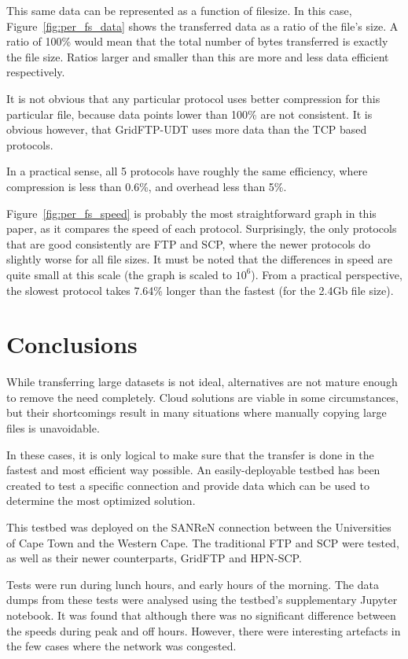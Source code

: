 \documentclass{sig-alternate-05-2015}
\begin{document}
This same data can be represented as a function of filesize. In this case, Figure~\ref{fig:per_fs_data} shows the transferred data as a ratio of the file's size. A ratio of 100\% would mean that the total number of bytes transferred is exactly the file size. Ratios larger and smaller than this are more and less data efficient respectively.

It is not obvious that any particular protocol uses better compression for this particular file, because data points lower than 100\% are not consistent. It is obvious however, that GridFTP-UDT uses more data than the TCP based protocols.

In a practical sense, all 5 protocols have roughly the same efficiency, where compression is less than 0.6\%, and overhead less than 5\%.

Figure~\ref{fig:per_fs_speed} is probably the most straightforward graph in this paper, as it compares the speed of each protocol. Surprisingly, the only protocols that are good consistently are FTP and SCP, where the newer protocols do slightly worse for all file sizes. It must be noted that the differences in speed are quite small at this scale (the graph is scaled to $10^6$). From a practical perspective, the slowest protocol takes 7.64\% longer than the fastest (for the 2.4Gb file size).

\section{Conclusions}
While transferring large datasets is not ideal, alternatives are not mature enough to remove the need completely. Cloud solutions are viable in some circumstances, but their shortcomings result in many situations where manually copying large files is unavoidable.

In these cases, it is only logical to make sure that the transfer is done in the fastest and most efficient way possible. An easily-deployable testbed has been created to test a specific connection and provide data which can be used to determine the most optimized solution.

This testbed was deployed on the SANReN connection between the Universities of Cape Town and the Western Cape. The traditional FTP and SCP were tested, as well as their newer counterparts, GridFTP and HPN-SCP.

Tests were run during lunch hours, and early hours of the morning. The data dumps from these tests were analysed using the testbed's supplementary Jupyter notebook. It was found that although there was no significant difference between the speeds during peak and off hours. However, there were interesting artefacts in the few cases where the network was congested.
\end{document}
